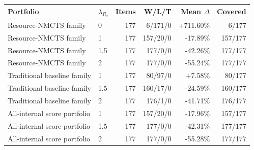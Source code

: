 \begin{tabular}{llrrrr}
\toprule
Portfolio & $\lambda_{R_z}$ & Items & W/L/T & Mean $\Delta$ & Covered \\
\midrule
Resource-NMCTS family & 0 & 177 & 6/171/0 & +711.60\% & 6/177 \\
Resource-NMCTS family & 1 & 177 & 157/20/0 & -17.89\% & 157/177 \\
Resource-NMCTS family & 1.5 & 177 & 177/0/0 & -42.26\% & 177/177 \\
Resource-NMCTS family & 2 & 177 & 177/0/0 & -55.24\% & 177/177 \\
Traditional baseline family & 1 & 177 & 80/97/0 & +7.58\% & 80/177 \\
Traditional baseline family & 1.5 & 177 & 160/17/0 & -24.59\% & 160/177 \\
Traditional baseline family & 2 & 177 & 176/1/0 & -41.71\% & 176/177 \\
All-internal score portfolio & 1 & 177 & 157/20/0 & -17.96\% & 157/177 \\
All-internal score portfolio & 1.5 & 177 & 177/0/0 & -42.31\% & 177/177 \\
All-internal score portfolio & 2 & 177 & 177/0/0 & -55.28\% & 177/177 \\
\bottomrule
\end{tabular}
